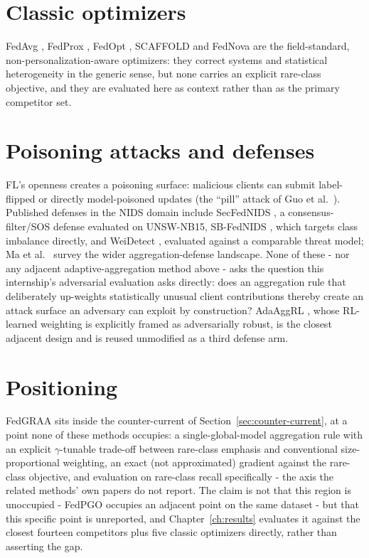 \documentclass[11pt,a4paper]{report}
\begin{document}
\section{Classic optimizers}
\label{sec:classic-opts}

FedAvg \cite{mcmahan2017fedavg}, FedProx \cite{fedprox}, FedOpt
\cite{reddi2021fedopt}, SCAFFOLD \cite{scaffold} and FedNova \cite{fednova}
are the field-standard, non-personalization-aware optimizers: they correct
systems and statistical heterogeneity in the generic sense, but none carries
an explicit rare-class objective, and they are evaluated here as context
rather than as the primary competitor set.

\section{Poisoning attacks and defenses}
\label{sec:poisoning}

FL's openness creates a poisoning surface: malicious clients can submit
label-flipped or directly model-poisoned updates (the ``pill'' attack of Guo
et al.\ \cite{guo2026pill}). Published defenses in the NIDS domain include
SecFedNIDS \cite{secfednids}, a consensus-filter/SOS defense evaluated on
UNSW-NB15, SB-FedNIDS \cite{sbfednids}, which targets class imbalance
directly, and WeiDetect \cite{weidetect}, evaluated against a comparable
threat model; Ma et al.\ \cite{mayang2026} survey the wider
aggregation-defense landscape. None of these - nor any adjacent adaptive-aggregation method
above - asks the question this internship's adversarial evaluation asks
directly: does an aggregation rule that deliberately up-weights statistically
unusual client contributions thereby create an attack surface an adversary
can exploit by construction? AdaAggRL \cite{adaaggrl}, whose RL-learned
weighting is explicitly framed as adversarially robust, is the closest
adjacent design and is reused unmodified as a third defense arm.

\section{Positioning}
\label{sec:positioning}

FedGRAA sits inside the counter-current of Section~\ref{sec:counter-current},
at a point none of these methods occupies: a single-global-model aggregation
rule with an explicit $\gamma$-tunable trade-off between rare-class emphasis
and conventional size-proportional weighting, an exact (not approximated)
gradient against the rare-class objective, and evaluation on rare-class
recall specifically - the axis the related methods' own papers do not report.
The claim is not that this region is unoccupied - FedPGO occupies an adjacent
point on the same dataset - but that this specific point is unreported, and
Chapter~\ref{ch:results} evaluates it against the closest fourteen
competitors plus five classic optimizers directly, rather than asserting the
gap.
\end{document}
